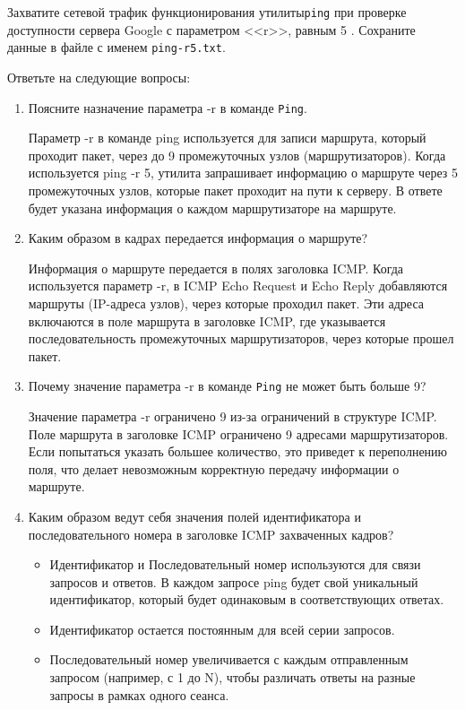 Захватите сетевой трафик функционирования утилиты\texttt{ping} 
при проверке доступности сервера Google с параметром <<r>>,
равным 5 .
Сохраните данные в файле с именем \texttt{ping-r5.txt}.

Ответьте на следующие вопросы:

\begin{enumerate}
	\item Поясните назначение параметра -r в команде \texttt{Ping}. \par
		Параметр -r в команде ping используется для записи маршрута,
		который проходит пакет, через до 9 промежуточных узлов
		(маршрутизаторов). Когда используется ping -r 5,
		утилита запрашивает информацию о маршруте через 5 промежуточных узлов,
		которые пакет проходит на пути к серверу.
		В ответе будет указана информация о каждом маршрутизаторе на маршруте.
	\item Каким образом в кадрах передается информация о маршруте? \par
		Информация о маршруте передается в полях заголовка ICMP.
		Когда используется параметр -r,
		в ICMP Echo Request и Echo Reply добавляются маршруты
		(IP-адреса узлов), через которые проходил пакет.
		Эти адреса включаются в поле маршрута в заголовке ICMP,
		где указывается последовательность промежуточных маршрутизаторов,
		через которые прошел пакет.
	\item Почему значение параметра -r в команде \texttt{Ping}
		не может быть больше 9? \par
		Значение параметра -r ограничено 9 из-за ограничений в структуре ICMP.
		Поле маршрута в заголовке ICMP ограничено 9 адресами маршрутизаторов.
		Если попытаться указать большее количество,
		это приведет к переполнению поля,
		что делает невозможным корректную передачу информации о маршруте.
	\item Каким образом ведут себя значения полей идентификатора
		и последовательного номера в заголовке ICMP захваченных кадров? \par
		\begin{itemize}
			\item Идентификатор и Последовательный номер используются
				для связи запросов и ответов.
				В каждом запросе ping будет свой уникальный идентификатор,
				который будет одинаковым в соответствующих ответах.
			\item Идентификатор остается постоянным для всей серии запросов.
			\item Последовательный номер увеличивается
				с каждым отправленным запросом (например, с 1 до N),
				чтобы различать ответы на разные запросы
				в рамках одного сеанса.
		\end{itemize}
\end{enumerate}

